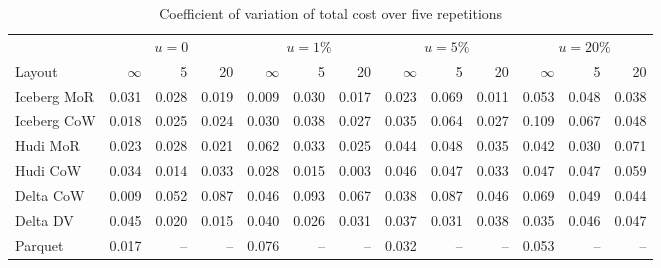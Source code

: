 \documentclass[conference]{IEEEtran}
\begin{document}
\begin{table}[!t]\centering
\caption{Coefficient of variation of total cost over five repetitions}\label{tab:a-cv}
\footnotesize
\begin{tabular}{@{}lrrrrrrrrrrrr@{}}\toprule
 & \multicolumn{3}{c}{$u=0$} & \multicolumn{3}{c}{$u=1\%$} & \multicolumn{3}{c}{$u=5\%$} & \multicolumn{3}{c}{$u=20\%$}\\
\cmidrule(lr){2-4}\cmidrule(lr){5-7}\cmidrule(lr){8-10}\cmidrule(lr){11-13}
Layout & $\infty$ & 5 & 20 & $\infty$ & 5 & 20 & $\infty$ & 5 & 20 & $\infty$ & 5 & 20\\\midrule
Iceberg MoR & 0.031 & 0.028 & 0.019 & 0.009 & 0.030 & 0.017 & 0.023 & 0.069 & 0.011 & 0.053 & 0.048 & 0.038\\
Iceberg CoW & 0.018 & 0.025 & 0.024 & 0.030 & 0.038 & 0.027 & 0.035 & 0.064 & 0.027 & 0.109 & 0.067 & 0.048\\
Hudi MoR & 0.023 & 0.028 & 0.021 & 0.062 & 0.033 & 0.025 & 0.044 & 0.048 & 0.035 & 0.042 & 0.030 & 0.071\\
Hudi CoW & 0.034 & 0.014 & 0.033 & 0.028 & 0.015 & 0.003 & 0.046 & 0.047 & 0.033 & 0.047 & 0.047 & 0.059\\
Delta CoW & 0.009 & 0.052 & 0.087 & 0.046 & 0.093 & 0.067 & 0.038 & 0.087 & 0.046 & 0.069 & 0.049 & 0.044\\
Delta DV & 0.045 & 0.020 & 0.015 & 0.040 & 0.026 & 0.031 & 0.037 & 0.031 & 0.038 & 0.035 & 0.046 & 0.047\\
Parquet & 0.017 & -- & -- & 0.076 & -- & -- & 0.032 & -- & -- & 0.053 & -- & --\\\bottomrule
\end{tabular}
\end{table}
\end{document}

